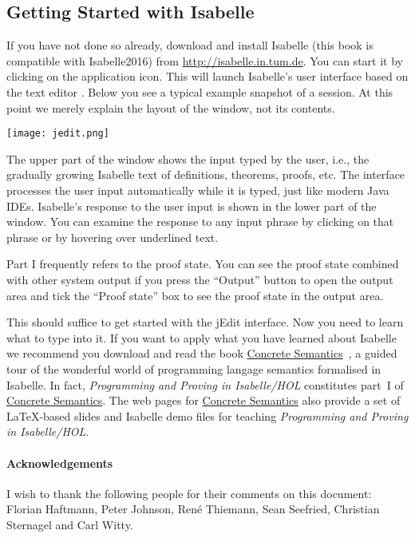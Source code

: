 \ifsem
\subsection*{Getting Started with Isabelle}

If you have not done so already, download and install Isabelle
(this book is compatible with Isabelle2016)
from \url{http://isabelle.in.tum.de}. You can start it by clicking
on the application icon. This will launch Isabelle's
user interface based on the text editor . Below you see
a typical example snapshot of a session. At this point we merely explain
the layout of the window, not its contents.

\begin{center}
\texttt{[image: jedit.png]}
\end{center}
The upper part of the window shows the input typed by the user, i.e., the
gradually growing Isabelle text of definitions, theorems, proofs, etc.  The
interface processes the user input automatically while it is typed, just like
modern Java IDEs.  Isabelle's response to the user input is shown in the
lower part of the window. You can examine the response to any input phrase
by clicking on that phrase or by hovering over underlined text.

\begin{warn}\label{proof-state}
Part I frequently refers to the proof state.
You can see the proof state combined with other system output if you
press the ``Output'' button to open the output area and tick the 
``Proof state'' box to see the proof state in the output area.
\end{warn}

This should suffice to get started with the jEdit interface.
Now you need to learn what to type into it.
\else
If you want to apply what you have learned about Isabelle we recommend you
download and read the book
\href{http://www.concrete-semantics.org}{Concrete
Semantics}~\cite{ConcreteSemantics}, a guided tour of the wonderful world of
programming langage semantics formalised in Isabelle.  In fact,
\emph{Programming and Proving in Isabelle/HOL} constitutes part~I of
\href{http://www.concrete-semantics.org}{Concrete Semantics}.  The web
pages for \href{http://www.concrete-semantics.org}{Concrete Semantics}
also provide a set of \LaTeX-based slides and Isabelle demo files
for teaching \emph{Programming and Proving in Isabelle/HOL}.
\fi

\ifsem\else
\paragraph{Acknowledgements}
I wish to thank the following people for their comments on this document:
Florian Haftmann, Peter Johnson, Ren\'{e} Thiemann, Sean Seefried,
Christian Sternagel and Carl Witty.
\fi